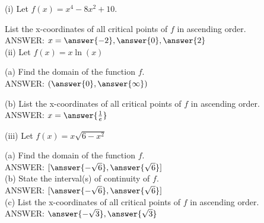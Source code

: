 \documentclass{ximera}
\begin{document}
\begin{exercise}
(i) Let $f(x)=x^4-8x^2+10$. 

 List the x-coordinates of all critical points of $f$ in ascending order.\\

ANSWER: $x=\answer{-2},\answer{0},\answer{2}$\\



(ii) Let $f(x)=x\ln(x)$

(a) Find the domain of the function $f$.\\

ANSWER: $(\answer{0},\answer{\infty})$

(b)  List the x-coordinates of all  critical points of $f$ in ascending order.\\

ANSWER: $x=\answer{\frac{1}{e}}$







(iii) Let $f(x)=x\sqrt{6-x^2}$

(a) Find the domain of the function $f$.\\

ANSWER: $[\answer{-\sqrt{6}},\answer{\sqrt{6}}]$\\

(b) State the interval(s) of continuity of $f$.\\

ANSWER: $[\answer{-\sqrt{6}},\answer{\sqrt{6}}]$\\

(c) List the x-coordinates of all  critical points of $f$ in ascending order.\\

ANSWER: $\answer{-\sqrt{3}},\answer{\sqrt{3}}$\\


\end{exercise}
\end{document}
